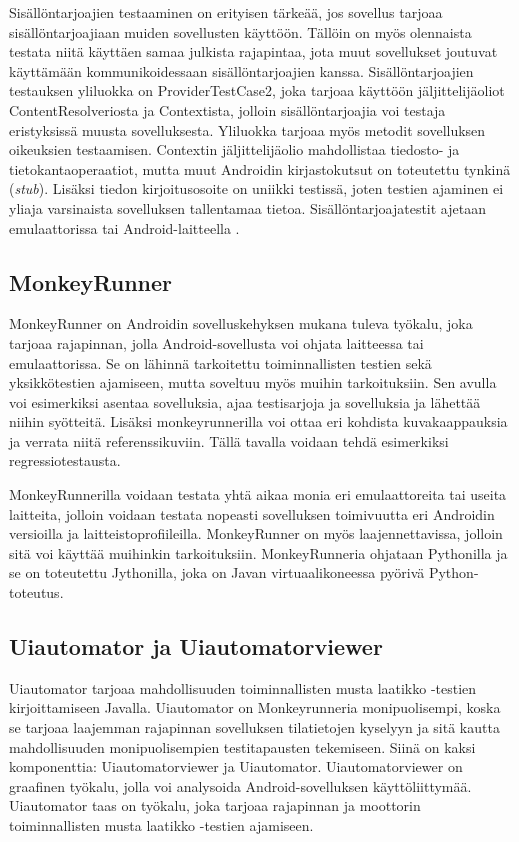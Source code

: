 Sisällöntarjoajien testaaminen on erityisen tärkeää, jos sovellus tarjoaa sisällöntarjoajiaan muiden sovellusten käyttöön. Tällöin on myös olennaista testata niitä käyttäen samaa julkista rajapintaa, jota muut sovellukset joutuvat käyttämään kommunikoidessaan sisällöntarjoajien kanssa. Sisällöntarjoajien testauksen yliluokka on ProviderTestCase2, joka tarjoaa käyttöön jäljittelijäoliot ContentResolveriosta ja Contextista, jolloin sisällöntarjoajia voi testaja eristyksissä muusta sovelluksesta. Yliluokka tarjoaa myös metodit sovelluksen oikeuksien testaamisen. Contextin jäljittelijäolio mahdollistaa tiedosto- ja tietokantaoperaatiot, mutta muut Androidin kirjastokutsut on toteutettu tynkinä (\emph{stub}). Lisäksi tiedon kirjoitusosoite on uniikki testissä, joten testien ajaminen ei yliaja varsinaista sovelluksen tallentamaa tietoa. Sisällöntarjoajatestit ajetaan emulaattorissa tai Android-laitteella \cite{android_testing}.

\subsection{MonkeyRunner}
\label{monkeyrunner}

MonkeyRunner \cite{monkeyrunner} on Androidin sovelluskehyksen mukana tuleva työkalu, joka tarjoaa rajapinnan, jolla Android-sovellusta voi ohjata laitteessa tai emulaattorissa. Se on lähinnä tarkoitettu toiminnallisten testien sekä yksikkötestien ajamiseen, mutta soveltuu myös muihin tarkoituksiin. Sen avulla voi esimerkiksi asentaa sovelluksia, ajaa testisarjoja ja sovelluksia ja lähettää niihin syötteitä. Lisäksi monkeyrunnerilla voi ottaa eri kohdista kuvakaappauksia ja verrata niitä referenssikuviin. Tällä tavalla voidaan tehdä esimerkiksi regressiotestausta.

MonkeyRunnerilla voidaan testata yhtä aikaa monia eri emulaattoreita tai useita laitteita, jolloin voidaan testata nopeasti sovelluksen toimivuutta eri Androidin versioilla ja laitteistoprofiileilla. MonkeyRunner on myös laajennettavissa, jolloin sitä voi käyttää muihinkin tarkoituksiin. MonkeyRunneria ohjataan Pythonilla ja se on toteutettu Jythonilla, joka on Javan virtuaalikoneessa pyörivä Python-toteutus.

\subsection{Uiautomator ja Uiautomatorviewer}

Uiautomator \cite{uiautomator} tarjoaa mahdollisuuden toiminnallisten musta laatikko -testien kirjoittamiseen Javalla. Uiautomator on Monkeyrunneria monipuolisempi, koska se tarjoaa laajemman rajapinnan sovelluksen tilatietojen kyselyyn ja sitä kautta mahdollisuuden monipuolisempien testitapausten tekemiseen. Siinä on kaksi komponenttia: Uiautomatorviewer ja Uiautomator. Uiautomatorviewer on graafinen työkalu, jolla voi analysoida Android-sovelluksen käyttöliittymää. Uiautomator taas on työkalu, joka tarjoaa rajapinnan ja moottorin toiminnallisten musta laatikko -testien ajamiseen.

